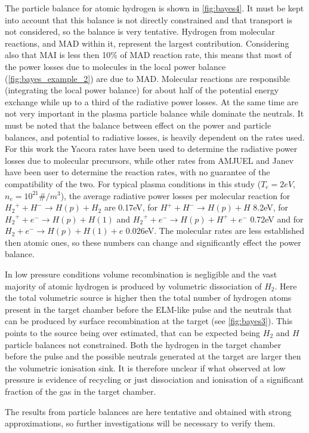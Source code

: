 The particle balance for atomic hydrogen is shown in \autoref{fig:bayes4}. It must be kept into account that this balance is not directly constrained and that transport is not considered, so the balance is very tentative. Hydrogen from molecular reactions, and MAD within it, represent the largest contribution. Considering also that MAI is less then 10\% of MAD reaction rate, this means that most of the power losses due to molecules in the local power balance (\autoref{fig:bayes_example_2}) are due to MAD. Molecular reactions are responsible (integrating the local power balance) for about half of the potential energy exchange while up to a third of the radiative power losses. At the same time are not very important in the plasma particle balance while dominate the neutrals. It must be noted that the balance between effect on the power and particle balances, and potential to radiative losses, is heavily dependent on the rates used. For this work the Yacora rates have been used to determine the radiative power losses due to molecular precursors, while other rates from AMJUEL and Janev have been user to determine the reaction rates, with no guarantee of the compatibility of the two. For typical plasma conditions in this study ($T_e=2eV$, $n_e=10^{21}\#/m^3$), the average radiative power losses per molecular reaction for ${H_2}^+ + H^- \rightarrow H(p) + H_2$ are 0.17eV, for $H^+ + H^- \rightarrow H(p) + H$ 8.2eV, for ${H_2}^+ + e^- \rightarrow H(p) + H(1)$ and ${H_2}^+ + e^- \rightarrow H(p) + H^+ + e^-$ 0.72eV and for $H_2 + e^- \rightarrow H(p) + H(1) + e$ 0.026eV. The molecular rates are less established then atomic ones, so these numbers can change and significantly effect the power balance.



In low pressure conditions volume recombination is negligible and the vast majority of atomic hydrogen is produced by volumetric dissociation of $H_2$. Here the total volumetric source is higher then the total number of hydrogen atoms present in the target chamber before the ELM-like pulse and the neutrals that can be produced by surface recombination at the target (see \autoref{fig:bayes3}). This points to the source being over estimated, that can be expected being $H_2$ and $H$ particle balances not constrained. Both the hydrogen in the target chamber before the pulse and the possible neutrals generated at the target are larger then the volumetric ionisation sink. It is therefore unclear if what observed at low pressure is evidence of recycling or just dissociation and ionisation of a significant fraction of the gas in the target chamber.

The results from particle balances are here tentative and obtained with strong approximations, so further investigations will be necessary to verify them.


